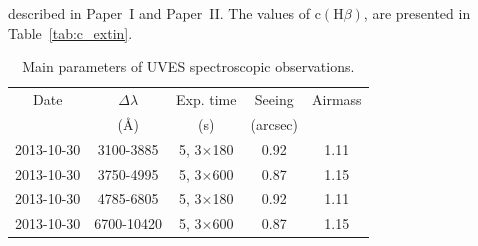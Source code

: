 \documentclass[fleqn,usenatbib]{mnras}
\begin{document}
described in Paper~I and Paper~II. The values of $\text{c}(\text{H}\beta)$, are presented in Table~\ref{tab:c_extin}. 

\begin{table}
\caption{Main parameters of UVES spectroscopic observations.}
\label{tab:obs_set}
\begin{tabular}{ccccc}
\hline
Date & $\Delta \lambda$& Exp. time  &Seeing &Airmass\\
 & (\AA) &  (s) & (arcsec)&\\
\hline
2013-10-30 & 3100-3885 & 5, 3$\times$180 &0.92&1.11\\
2013-10-30 & 3750-4995 & 5, 3$\times$600 & 0.87 & 1.15\\
2013-10-30 & 4785-6805 & 5, 3$\times$180 &0.92&1.11\\
2013-10-30 & 6700-10420 & 5, 3$\times$600 & 0.87 & 1.15\\
\hline
\end{tabular}
\end{table}
\end{document}
